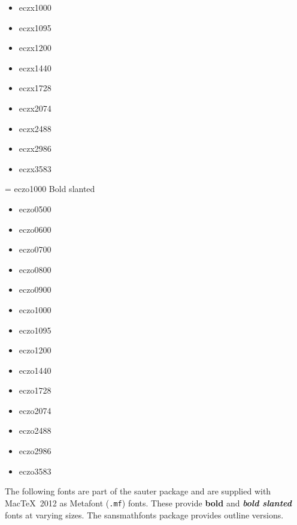 \documentclass{amsart}
\begin{document}
{\begin{itemize}[leftmargin=*]
\item \textsf{eczx1000}
\item \textsf{eczx1095}
\item \textsf{eczx1200}
\item \textsf{eczx1440}
\item \textsf{eczx1728}
\item \textsf{eczx2074}
\item \textsf{eczx2488}
\item \textsf{eczx2986}
\item \textsf{eczx3583}
\end{itemize}
}\parbox[t]{0.235\textwidth}{
\font\temp = eczo1000 \temp
Bold slanted
\begin{itemize}[leftmargin=*]
\item \textsf{eczo0500}
\item \textsf{eczo0600}
\item \textsf{eczo0700}
\item \textsf{eczo0800}
\item \textsf{eczo0900}
\item \textsf{eczo1000}
\item \textsf{eczo1095}
\item \textsf{eczo1200}
\item \textsf{eczo1440}
\item \textsf{eczo1728}
\item \textsf{eczo2074}
\item \textsf{eczo2488}
\item \textsf{eczo2986}
\item \textsf{eczo3583}
\end{itemize}
}

\bigskip

The following fonts are part of the \textsf{sauter} package and are supplied with Mac\TeX\ 2012 as Metafont (\texttt{.mf}) fonts. These provide \textsf{\textbf{bold}} and \textsf{\textsl{\textbf{bold slanted}}} fonts at varying sizes.
The \textsf{sansmathfonts} package provides outline versions.
\end{document}
